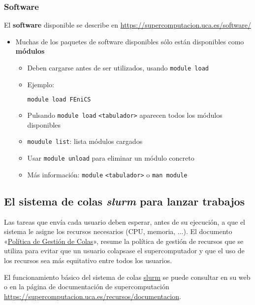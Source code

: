 \subsubsection*{Software}
El \textbf{software} disponible se describe en \url{https://supercomputacion.uca.es/software/}
\begin{itemize}
\item Muchas de los paquetes de software disponibles sólo están
  disponibles como \textbf{módulos}
  \begin{itemize}
  \item Deben cargarse antes de ser utilizados, usando
    \texttt{module load}
  \item Ejemplo:
    \begin{lstlisting}[language=sh]
      module load FEniCS
    \end{lstlisting}
  \item Pulsando \texttt{module load} \texttt{<tabulador>} aparecen
    todos los módulos disponibles
  \item \texttt{moudule list}: lista módulos cargados
  \item Usar \texttt{module unload} para eliminar un módulo concreto

  \item Más información: \texttt{module} \texttt{<tabulador>} o \texttt{man module}
  \end{itemize}
\end{itemize}

\subsection{El sistema de colas \textit{slurm} para lanzar trabajos}
\label{sec:supercomputador-UCA}
Las tareas que envía cada usuario deben esperar, antes de su
ejecución, a que el sistema le asigne los recursos necesarios (CPU,
memoria, ...). El documento
«\href{http://supercomputacion.uca.es/recursos/documentacion/politicas-de-gestion-de-colas}{Política
  de Gestión de Colas}», resume la política de gestión de recursos que
se utiliza para evitar que un usuario colapsase el supercomputador y
que el uso de los recursos sea más equitativo entre todos los
usuarios.

El funcionamiento básico del sistema de colas
\href{https://slurm.schedmd.com/quickstart.html}{slurm} se puede consultar en su
web o en la página de documentación de supercomputación
\url{https://supercomputacion.uca.es/recursos/documentacion}.

